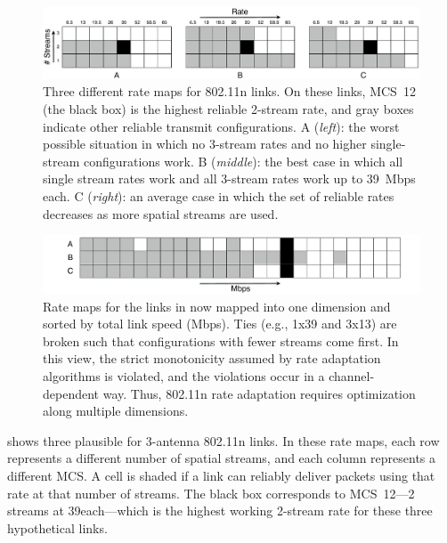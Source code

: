 \begin{figure}[t]
      \centering
      \includegraphics[width=\textwidth]{figures/rate_table_2d.pdf}
      \caption[Three different rate maps for 802.11n links.]{\label{fig:rate_table_2d}Three different rate maps for 802.11n links. On these links, MCS~12 (the black box) is the highest reliable 2-stream rate, and gray boxes indicate other reliable transmit configurations. A (\emph{left}): the worst possible situation in which no 3-stream rates and no higher single-stream configurations work. B (\emph{middle}): the best case in which all single stream rates work and all 3-stream rates work up to 39~Mbps each. C (\emph{right}): an average case in which the set of reliable rates decreases as more spatial streams are used.}
\end{figure}
\begin{figure}[t]
      \centering
      \includegraphics[width=\textwidth]{figures/rate_table_1d.pdf}
      \caption[Rate maps for the links in  mapped into one dimension]{\label{fig:rate_table_1d}Rate maps for the links in  now mapped into one dimension and sorted by total link speed (Mbps). Ties (e.g., 1x39 and 3x13) are broken such that configurations with fewer streams come first. In this view, the strict monotonicity assumed by rate adaptation algorithms is violated, and the violations occur in a channel-dependent way. Thus, 802.11n rate adaptation requires optimization along multiple dimensions.}
\end{figure}

 shows three plausible  for 3-antenna 802.11n links. In these rate maps, each row represents a different number of spatial streams, and each column represents a different MCS. A cell is shaded if a link can reliably deliver packets using that rate at that number of streams. The black box corresponds to MCS~12---2 streams at 39\Mbps each---which is the highest working 2-stream rate for these three hypothetical links.

